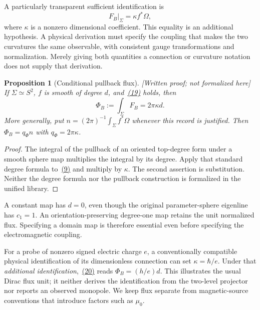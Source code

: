 \documentclass[11pt]{article}
\newtheorem{proposition}[theorem]{Proposition}
\theoremstyle{definition}\newtheorem{definition}[theorem]{Definition}
\theoremstyle{remark}\newtheorem{remark}[theorem]{Remark}
\newcommand{\written}{\textnormal{\small[Written proof; not formalized here]}\ }
\begin{document}
A particularly transparent sufficient identification is
\hypertarget{eq:physicalbridge}{}
\begin{equation}
 F_B\big|_\Sigma=\kappa f^*\Omega,
\end{equation}
where $\kappa$ is a nonzero dimensional coefficient. This equality is an additional hypothesis. A physical derivation must specify the coupling that makes the two curvatures the same observable, with consistent gauge transformations and normalization. Merely giving both quantities a connection or curvature notation does not supply that derivation.

\begin{proposition}[Conditional pullback flux]\label{prop:pullback}\written
If $\Sigma\simeq S^2$, $f$ is smooth of degree $d$, and~\hyperref[eq:physicalbridge]{(19)} holds, then
\hypertarget{eq:degreeflux}{}
\begin{equation}
 \Phi_B:=\int_\Sigma F_B=2\pi\kappa d.
\end{equation}
More generally, put $n=(2\pi)^{-1}\int_\Sigma f^*\Omega$ whenever this record is justified. Then $\Phi_B=q_\Phi n$ with $q_\Phi=2\pi\kappa$.
\end{proposition}
\begin{proof}
The integral of the pullback of an oriented top-degree form under a smooth sphere map multiplies the integral by its degree. Apply that standard degree formula to~\hyperref[eq:unit]{(9)} and multiply by $\kappa$. The second assertion is substitution. Neither the degree formula nor the pullback construction is formalized in the unified library.
\end{proof}
A constant map has $d=0$, even though the original parameter-sphere eigenline has $c_1=1$. An orientation-preserving degree-one map retains the unit normalized flux. Specifying a domain map is therefore essential even before specifying the electromagnetic coupling.

For a probe of nonzero signed electric charge $e$, a conventionally compatible physical identification of its dimensionless connection can set $\kappa=\hbar/e$. Under that \emph{additional identification},~\hyperref[eq:degreeflux]{(20)} reads $\Phi_B=(h/e)d$. This illustrates the usual Dirac flux unit; it neither derives the identification from the two-level projector nor reports an observed monopole. We keep flux separate from magnetic-source conventions that introduce factors such as $\mu_0$.
\end{document}
